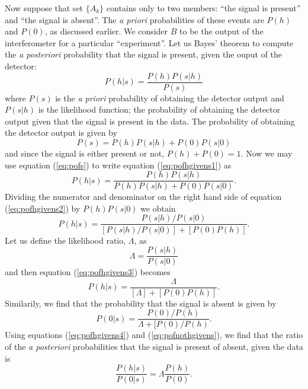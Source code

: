 Now suppose that set $\{A_k\}$ contains only to two members: ``the signal is
present'' and ``the signal is absent''. The \emph{a priori} probabilities of
these events are $P(h)$ and $P(0)$, as discussed earlier. We consider $B$ to
be the output of the interferometer for a particular ``experiment''. Let us
Bayes' theorem to compute the \emph{a posteriori} probability that the signal
is present, given the ouput of the detector:
\begin{equation}
P(h|s) = \frac{P(h)P(s|h)}{P(s)}
\label{eq:pofhgivens1}
\end{equation}
where $P(s)$ is the \emph{a priori} probability of obtaining the detector
output and $P(s|h)$ is the likelihood function; the probability of obtaining
the detector output given that the signal is present in the data. The
probability of obtaining the detector output is given by
\begin{equation}
P(s) = P(h)P(s|h) + P(0)P(s|0)
\label{eq:pofs}
\end{equation}
and since the signal is either present or not, $P(h) + P(0) = 1$. Now we may
use equation (\ref{eq:pofs}) to write equation (\ref{eq:pofhgivens1}) as
\begin{equation}
P(h|s) = \frac{P(h)P(s|h)}{P(h)P(s|h) + P(0)P(s|0)}.
\label{eq:pofhgivens2}
\end{equation}
Dividing the numerator and denominator on the right hand side of equation
(\ref{eq:pofhgivens2}) by $P(h)P(s|0)$ we obtain
\begin{equation}
P(h|s) = \frac{P(s|h)/P(s|0)}{[P(s|h)/P(s|0)] + [P(0)P(h)]}.
\label{eq:pofhgivens3}
\end{equation}
Let us define the likelihood ratio, $\Lambda$, as
\begin{equation}
\Lambda = \frac{P(s|h)}{P(s|0)}
\label{eq:likelihooddef}
\end{equation}
and then equation (\ref{eq:pofhgivens3}) becomes
\begin{equation}
P(h|s) = \frac{\Lambda}{[\Lambda] + [P(0)P(h)]}.
\label{eq:pofhgivens4}
\end{equation}
Similarily, we find that the probability that the signal is absent is given by
\begin{equation}
P(0|s) = \frac{P(0)/P(h)}{\Lambda + [P(0)/P(h)}.
\label{eq:pofnothgivens}
\end{equation}
Using equations (\ref{eq:pofhgivens4}) and (\ref{eq:pofnothgivens}), we find
that the ratio of the \emph{a posteriori} probabilities that the signal is
present of absent, given the data is
\begin{equation}
\frac{P(h|s)}{P(0|s)} = \Lambda\frac{P(h)}{P(0)}.
\label{eq:postratio}
\end{equation}


